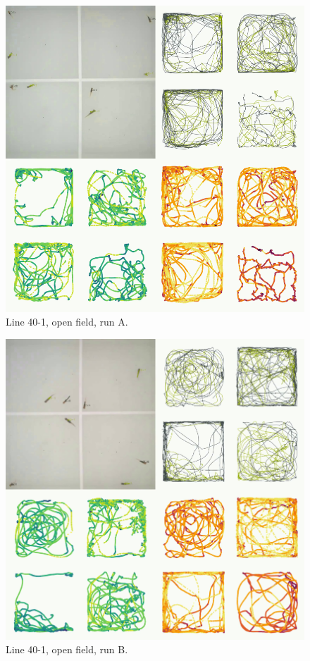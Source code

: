 \documentclass[
]{book}
\begin{document}
\begin{figure}
\includegraphics[width=1\linewidth]{figs/mikk_behaviour/four_panel_plots/open_field_20191114_1217_40-1_L_A_300} \caption{Line 40-1, open field, run A.}\label{fig:4p-40-1-of-A}
\end{figure}



\begin{figure}
\includegraphics[width=1\linewidth]{figs/mikk_behaviour/four_panel_plots/open_field_20191118_1129_40-1_R_B_300} \caption{Line 40-1, open field, run B.}\label{fig:4p-40-1-of-B}
\end{figure}
\end{document}
